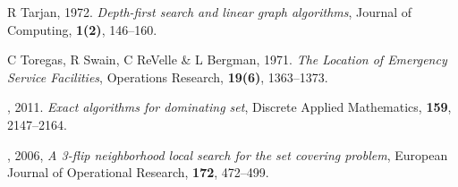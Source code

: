 \documentclass[10pt,a4paper]{article}
\begin{document}
{\begin{thebibliography}{10}
 {\sc R Tarjan}, 1972. {\em Depth-first search and linear graph algorithms}, Journal of Computing, {\bf 1(2)}, 146--160.

 {\sc C Toregas, R Swain, C ReVelle \& L Bergman}, 1971. {\em The Location of Emergency Service Facilities}, Operations Research, {\bf 19(6)}, 1363--1373.
 
, 2011. {\em Exact algorithms for dominating set}, Discrete Applied Mathematics, {\bf 159}, 2147--2164.

, 2006, {\em A 3-flip neighborhood local search for the set covering problem}, European Journal of Operational Research, {\bf 172}, 472--499.


\end{thebibliography}}
\end{document}
